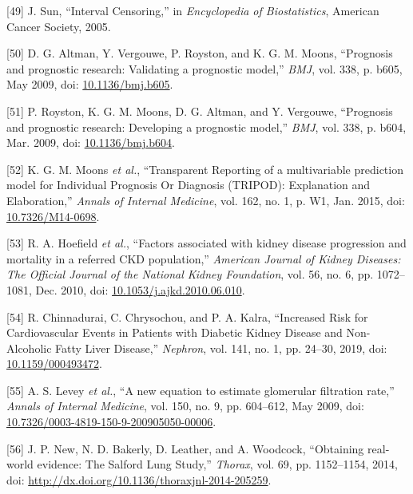 \documentclass[
]{article}
\newenvironment{cslreferences}%
  {}%
  {\par}
\begin{document}
\begin{cslreferences}
\leavevmode\hypertarget{ref-sun_interval_2005}{}%
{[}49{]} J. Sun, ``Interval Censoring,'' in \emph{Encyclopedia of Biostatistics}, American Cancer Society, 2005.

\leavevmode\hypertarget{ref-altman_prognosis_2009}{}%
{[}50{]} D. G. Altman, Y. Vergouwe, P. Royston, and K. G. M. Moons, ``Prognosis and prognostic research: Validating a prognostic model,'' \emph{BMJ}, vol. 338, p. b605, May 2009, doi: \href{https://doi.org/10.1136/bmj.b605}{10.1136/bmj.b605}.

\leavevmode\hypertarget{ref-royston_prognosis_2009}{}%
{[}51{]} P. Royston, K. G. M. Moons, D. G. Altman, and Y. Vergouwe, ``Prognosis and prognostic research: Developing a prognostic model,'' \emph{BMJ}, vol. 338, p. b604, Mar. 2009, doi: \href{https://doi.org/10.1136/bmj.b604}{10.1136/bmj.b604}.

\leavevmode\hypertarget{ref-moons_transparent_2015}{}%
{[}52{]} K. G. M. Moons \emph{et al.}, ``Transparent Reporting of a multivariable prediction model for Individual Prognosis Or Diagnosis (TRIPOD): Explanation and Elaboration,'' \emph{Annals of Internal Medicine}, vol. 162, no. 1, p. W1, Jan. 2015, doi: \href{https://doi.org/10.7326/M14-0698}{10.7326/M14-0698}.

\leavevmode\hypertarget{ref-hoefield_factors_2010}{}%
{[}53{]} R. A. Hoefield \emph{et al.}, ``Factors associated with kidney disease progression and mortality in a referred CKD population,'' \emph{American Journal of Kidney Diseases: The Official Journal of the National Kidney Foundation}, vol. 56, no. 6, pp. 1072--1081, Dec. 2010, doi: \href{https://doi.org/10.1053/j.ajkd.2010.06.010}{10.1053/j.ajkd.2010.06.010}.

\leavevmode\hypertarget{ref-chinnadurai_increased_2019-1}{}%
{[}54{]} R. Chinnadurai, C. Chrysochou, and P. A. Kalra, ``Increased Risk for Cardiovascular Events in Patients with Diabetic Kidney Disease and Non-Alcoholic Fatty Liver Disease,'' \emph{Nephron}, vol. 141, no. 1, pp. 24--30, 2019, doi: \href{https://doi.org/10.1159/000493472}{10.1159/000493472}.

\leavevmode\hypertarget{ref-levey_new_2009}{}%
{[}55{]} A. S. Levey \emph{et al.}, ``A new equation to estimate glomerular filtration rate,'' \emph{Annals of Internal Medicine}, vol. 150, no. 9, pp. 604--612, May 2009, doi: \href{https://doi.org/10.7326/0003-4819-150-9-200905050-00006}{10.7326/0003-4819-150-9-200905050-00006}.

\leavevmode\hypertarget{ref-new_obtaining_2014}{}%
{[}56{]} J. P. New, N. D. Bakerly, D. Leather, and A. Woodcock, ``Obtaining real-world evidence: The Salford Lung Study,'' \emph{Thorax}, vol. 69, pp. 1152--1154, 2014, doi: \href{https://doi.org/http://dx.doi.org/10.1136/thoraxjnl-2014-205259}{http://dx.doi.org/10.1136/thoraxjnl-2014-205259}.


\end{cslreferences}
\end{document}

